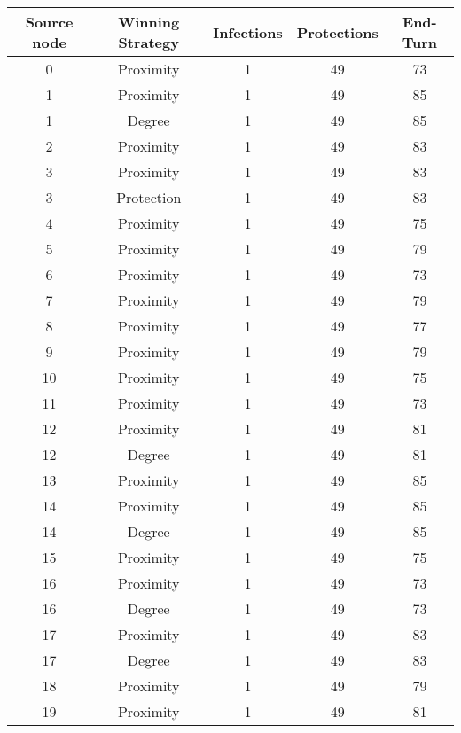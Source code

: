 \documentclass[results.tex]{subfiles}
\begin{document}
\begin{center}
  \begin{tabular}{| c || c | c | c | c |}
    \hline
    {\bfseries Source node} & {\bfseries Winning Strategy} & {\bfseries Infections} & {\bfseries Protections} & {\bfseries End-Turn} \\  %
    \hline\hline
    0 & Proximity & 1 & 49 & 73 \\ 
    \hline
    1 & Proximity & 1 & 49 & 85 \\ 
    \hline
    1 & Degree & 1 & 49 & 85 \\ 
    \hline
    2 & Proximity & 1 & 49 & 83 \\ 
    \hline
    3 & Proximity & 1 & 49 & 83 \\ 
    \hline
    3 & Protection & 1 & 49 & 83 \\ 
    \hline
    4 & Proximity & 1 & 49 & 75 \\ 
    \hline
    5 & Proximity & 1 & 49 & 79 \\ 
    \hline
    6 & Proximity & 1 & 49 & 73 \\ 
    \hline
    7 & Proximity & 1 & 49 & 79 \\ 
    \hline
    8 & Proximity & 1 & 49 & 77 \\ 
    \hline
    9 & Proximity & 1 & 49 & 79 \\ 
    \hline
    10 & Proximity & 1 & 49 & 75 \\ 
    \hline
    11 & Proximity & 1 & 49 & 73 \\ 
    \hline
    12 & Proximity & 1 & 49 & 81 \\ 
    \hline
    12 & Degree & 1 & 49 & 81 \\ 
    \hline
    13 & Proximity & 1 & 49 & 85 \\ 
    \hline
    14 & Proximity & 1 & 49 & 85 \\ 
    \hline
    14 & Degree & 1 & 49 & 85 \\ 
    \hline
    15 & Proximity & 1 & 49 & 75 \\ 
    \hline
    16 & Proximity & 1 & 49 & 73 \\ 
    \hline
    16 & Degree & 1 & 49 & 73 \\ 
    \hline
    17 & Proximity & 1 & 49 & 83 \\ 
    \hline
    17 & Degree & 1 & 49 & 83 \\ 
    \hline
    18 & Proximity & 1 & 49 & 79 \\ 
    \hline
    19 & Proximity & 1 & 49 & 81 \\ 

\end{tabular}
\end{center}
\end{document}
